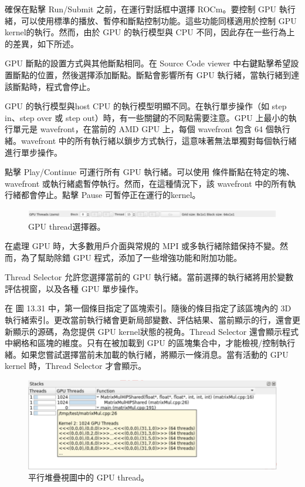 確保在點擊 Run/Submit 之前，在運行對話框中選擇 ROCm。要控制 GPU 執行緒，可以使用標準的播放、暫停和斷點控制功能。這些功能同樣適用於控制 GPU kernel的執行。然而，由於 GPU 的執行模型與 CPU 不同，因此存在一些行為上的差異，如下所述。

GPU 斷點的設置方式與其他斷點相同。在 Source Code viewer 中右鍵點擊希望設置斷點的位置，然後選擇添加斷點。斷點會影響所有 GPU 執行緒，當執行緒到達該斷點時，程式會停止。

GPU 的執行模型與host CPU 的執行模型明顯不同。在執行單步操作（如 step in、step over 或 step out）時，有一些關鍵的不同點需要注意。GPU 上最小的執行單元是 wavefront，在當前的 AMD GPU 上，每個 wavefront 包含 64 個執行緒。wavefront 中的所有執行緒以鎖步方式執行，這意味著無法單獨對每個執行緒進行單步操作。

點擊 Play/Continue 可運行所有 GPU 執行緒。可以使用 條件斷點在特定的塊、wavefront 或執行緒處暫停執行。然而，在這種情況下，該 wavefront 中的所有執行緒都會停止。點擊 Pause 可暫停正在運行的kernel。

\begin{figure}
    \centering
    \includegraphics[width=0.9\linewidth]{FileAusiliari/Screenshots/Figure13-31.png}
    \caption{GPU thread選擇器。}
    \label{fig:PAPI31}
\end{figure}

在處理 GPU 時，大多數用戶介面與常規的 MPI 或多執行緒除錯保持不變。然而，為了幫助除錯 GPU 程式，添加了一些增強功能和附加功能。

Thread Selector 允許您選擇當前的 GPU 執行緒。當前選擇的執行緒將用於變數評估視窗，以及各種 GPU 單步操作。

在 圖 13.31 中，第一個條目指定了區塊索引。隨後的條目指定了該區塊內的 3D 執行緒索引。更改當前執行緒會更新局部變數、評估結果、當前顯示的行，還會更新顯示的源碼，為您提供 GPU kernel狀態的視角。Thread Selector 還會顯示程式中網格和區塊的維度。只有在被加載到 GPU 的區塊集合中，才能檢視/控制執行緒。如果您嘗試選擇當前未加載的執行緒，將顯示一條消息。當有活動的 GPU kernel 時，Thread Selector 才會顯示。

\begin{figure}
    \centering
    \includegraphics[width=0.9\linewidth]{FileAusiliari/Screenshots/Figure13-32.png}
    \caption{平行堆疊視圖中的 GPU thread。}
    \label{fig:PAPI32}
\end{figure}

